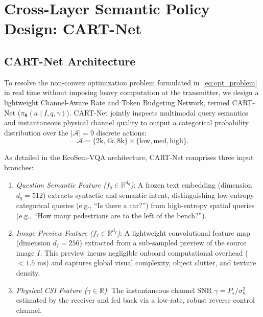 \section{Cross-Layer Semantic Policy Design: CART-Net}\label{sec:policy}

\subsection{CART-Net Architecture}
To resolve the non-convex optimization problem formulated in~\eqref{eq:opt_problem} in real time without imposing heavy computation at the transmitter, we design a lightweight Channel-Aware Rate and Token Budgeting Network, termed CART-Net ($\pi_{\boldsymbol{\theta}}(a \mid I, q, \gamma)$). CART-Net jointly inspects multimodal query semantics and instantaneous physical channel quality to output a categorical probability distribution over the $|\mathcal{A}| = 9$ discrete actions:
\begin{equation}
\mathcal{A} = \{2\text{k}, 4\text{k}, 8\text{k}\} \times \{\mathrm{low}, \mathrm{med}, \mathrm{high}\}.
\end{equation}

As detailed in the EcoSem-VQA architecture, CART-Net comprises three input branches:
\begin{enumerate}
    \item \textit{Question Semantic Feature ($f_q \in \mathbb{R}^{d_q}$)}: A frozen text embedding (dimension $d_q = 512$) extracts syntactic and semantic intent, distinguishing low-entropy categorical queries (e.g., ``Is there a car?'') from high-entropy spatial queries (e.g., ``How many pedestrians are to the left of the bench?'').
    \item \textit{Image Preview Feature ($f_I \in \mathbb{R}^{d_I}$)}: A lightweight convolutional feature map (dimension $d_I = 256$) extracted from a sub-sampled preview of the source image $I$. This preview incurs negligible onboard computational overhead ($< 1.5\text{ ms}$) and captures global visual complexity, object clutter, and texture density.
    \item \textit{Physical CSI Feature ($\gamma \in \mathbb{R}$)}: The instantaneous channel SNR $\gamma = P_s / \sigma_n^2$ estimated by the receiver and fed back via a low-rate, robust reverse control channel.
\end{enumerate}

